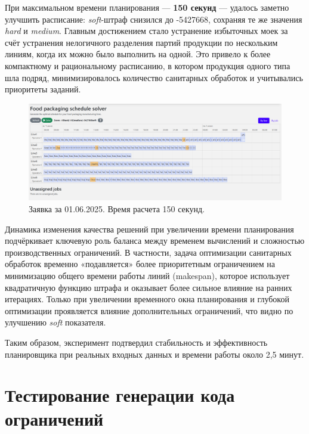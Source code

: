 При максимальном времени планирования — \textbf{150 секунд} — удалось заметно улучшить расписание: \textit{soft}-штраф снизился до -5427668, сохраняя те же значения \textit{hard} и \textit{medium}. Главным достижением стало устранение избыточных моек за счёт устранения нелогичного разделения партий продукции по нескольким линиям, когда их можно было выполнить на одной. Это привело к более компактному и рациональному расписанию, в котором продукция одного типа шла подряд, минимизировалось количество санитарных обработок и учитывались приоритеты заданий.

\begin{figure}[ht]
 \centering
        \includegraphics[height = 6 cm, keepaspectratio]{../assets/images/tests/150sec_01.png}
		\caption{Заявка за 01.06.2025. Время расчета 150 секунд.}
		\label{fig:quarkus_150sec_01}
\end{figure}

Динамика изменения качества решений при увеличении времени планирования подчёркивает ключевую роль баланса между временем вычислений и сложностью производственных ограничений. В частности, задача оптимизации санитарных обработок временно «подавляется» более приоритетным ограничением на минимизацию общего времени работы линий (makespan), которое использует квадратичную функцию штрафа и оказывает более сильное влияние на ранних итерациях. Только при увеличении временного окна планирования и глубокой оптимизации проявляется влияние дополнительных ограничений, что видно по улучшению \textit{soft} показателя.

Таким образом, эксперимент подтвердил стабильность и эффективность планировщика при реальных входных данных и времени работы около 2,5 минут.

\section*{Тестирование генерации кода ограничений}

